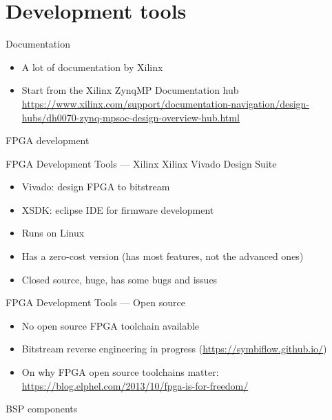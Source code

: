 \documentclass[xetex,table]{beamer}
\begin{document}
\section{Development tools}

\begin{frame}{Documentation}
  \begin{itemize}
  \item A lot of documentation by Xilinx
  \item Start from the Xilinx ZynqMP Documentation hub\\
    {\tiny\url{https://www.xilinx.com/support/documentation-navigation/design-hubs/dh0070-zynq-mpsoc-design-overview-hub.html}}
  \end{itemize}
\end{frame}

\begin{frame}[standout]
  FPGA development
\end{frame}

\begin{frame}{FPGA Development Tools --- Xilinx}
  Xilinx Vivado Design Suite
  \begin{itemize}
  \item Vivado: design FPGA to bitstream
  \item XSDK: eclipse IDE for firmware development
  \item Runs on Linux
  \item Has a zero-cost version (has most features, not the advanced
    ones)
  \item Closed source, huge, has some bugs and issues
  \end{itemize}
\end{frame}

\begin{frame}{FPGA Development Tools --- Open source}
  \begin{itemize}
  \item No open source FPGA toolchain available
  \item Bitstream reverse engineering in progress
    (\url{https://symbiflow.github.io/})
  \item On why FPGA open source toolchains matter:
    {\footnotesize\url{https://blog.elphel.com/2013/10/fpga-is-for-freedom/}}
  \end{itemize}
\end{frame}

\begin{frame}[standout]
  BSP components
\end{frame}
\end{document}
